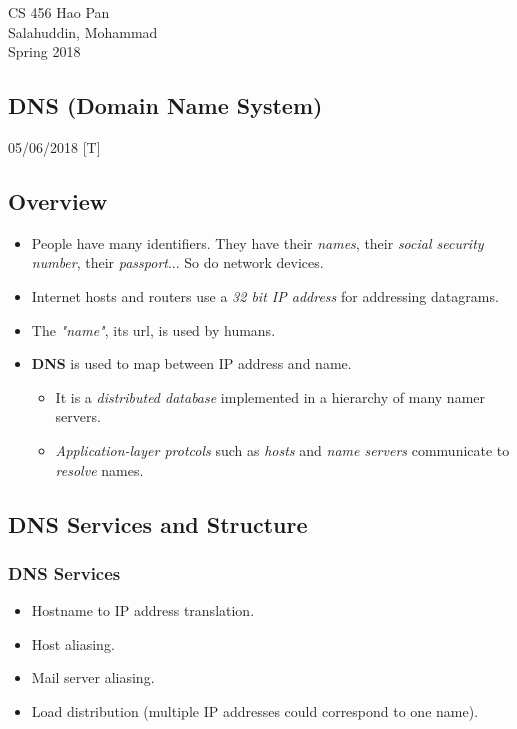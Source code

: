 \documentclass{article}
\begin{document}
\noindent
{CS 456 \hfill Hao Pan}\\
{Salahuddin, Mohammad}\\
{Spring 2018}


\begin{center}
\section{DNS (Domain Name System)}
\noindent
{\hfill 05/06/2018 [T]}
\end{center}

\subsection{Overview}

\begin{itemize}
\item People have many identifiers. They have their {\it names}, their {\it social security number}, their {\it passport}... So do network devices.
\item Internet hosts and routers use a {\it 32 bit IP address} for addressing datagrams.
\item The {\it "name"}, its url, is used by humans.
\item {\bf DNS} is used to map between IP address and name.
\begin{itemize}
\item It is a {\it distributed database} implemented in a hierarchy of many namer servers.
\item {\it Application-layer protcols} such as {\it hosts} and {\it name servers} communicate to {\it resolve} names.
\end{itemize}
\end{itemize}

\subsection{DNS Services and Structure}

\subsubsection{DNS Services}
\begin{itemize}
\item Hostname to IP address translation.
\item Host aliasing.
\item Mail server aliasing.
\item Load distribution (multiple IP addresses could correspond to one name).
\end{itemize}
\end{document}
